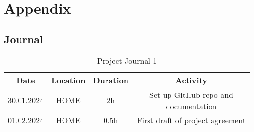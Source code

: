 \chapter{Appendix}
\label{cha:Appendix}

\section{Journal}
\label{sec:Journal}

\begin{table}[H]
    \centering
    
\begin{tabular}{||c | c | c || c||} 
 \hline
 Date &  Location & Duration & Activity \\ [0.5ex] 
 \hline\hline
  30.01.2024 & HOME & 2h & Set up GitHub repo and documentation \\ 
 \hline
   01.02.2024 & HOME & 0.5h & First draft of project agreement \\ 
 \hline


\end{tabular}
    \caption{Project Journal 1}
    \label{tab:Project Journal 1}
\end{table}

\newpage
